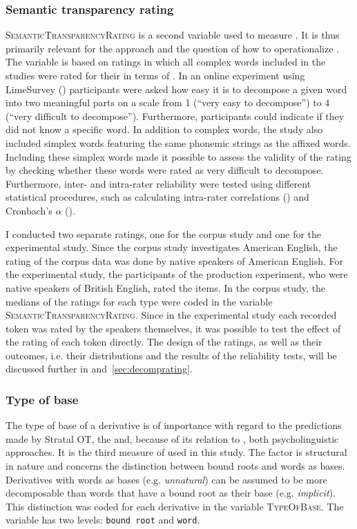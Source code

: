 \subsubsection{Semantic transparency rating} \textsc{SemanticTransparencyRating} is a second variable used to measure . It is thus primarily relevant for the  approach and the question of how to operationalize .  
 The variable is based on ratings in which all complex words included in the studies were rated for their  in terms of .
  In an online experiment using LimeSurvey (\citealt{LimeSurveyProjectTeam.2015}) participants  were asked how easy it is to decompose a given word into two meaningful parts on a scale from 1 (``very easy to decompose'') to 4 (``very difficult to decompose''). Furthermore, participants could indicate if they did not know a specific word. In addition to complex words, the study also included simplex words featuring the same phonemic strings as the affixed words. Including these simplex words made it possible to assess the validity of the rating by checking whether these words were rated as very difficult to decompose. Furthermore, inter- and intra-rater reliability were tested using different statistical procedures, such as calculating intra-rater correlations (\citealt{Bartko.1966}) and Cronbach's $\alpha$ (\citealt{Cronbach.1951}). 

I conducted two separate ratings, one for the corpus study and one for the experimental study. Since the corpus study investigates American English, the rating of the corpus data was done by native speakers of American English. For the experimental study, the participants of the production experiment, who were native speakers of British English, rated the items. 
In the corpus study, the medians of the ratings for each type were coded in the variable \textsc{SemanticTransparencyRating}. Since in the experimental study each recorded token was rated by the speakers themselves, it was possible to test the effect of the rating of each token directly.
The design of the ratings, as well as their outcomes, i.e. their distributions and the results of the reliability tests, will be discussed further in  and~\ref{sec:decomprating}.


\subsubsection{Type of base} 
The type of base of a derivative is of importance with regard to the predictions made by Stratal OT, the  and, because of its relation to , both psycholinguistic approaches. It is
the third measure of  used in this study. The factor is structural in nature and concerns the distinction between bound roots and words as bases. Derivatives with words as bases  (e.g. \textit{unnatural}) can be assumed to be more decomposable than words that have a bound root as their base  (e.g. \textit{implicit}). This distinction was coded for each derivative in the variable \textsc{TypeOfBase}. The variable has two levels: \texttt{bound root} and \texttt{word}.


